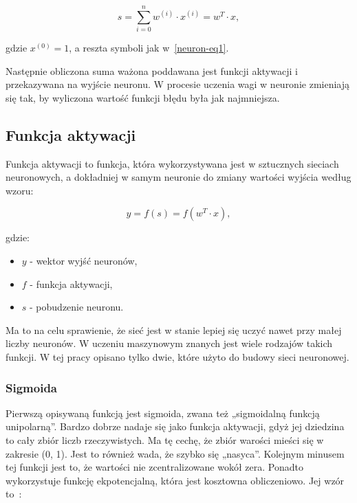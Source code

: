     \begin{equation}
        s = \sum _{i=0}^{n} {w^{(i)} \cdot x^{(i)}} = w^T \cdot x,
        \label{neuron-eq2}
    \end{equation}

    gdzie $x^{(0)} = 1$, a reszta symboli jak w~\ref{neuron-eq1}.

    Następnie obliczona suma ważona poddawana jest funkcji aktywacji i przekazywana na wyjście neuronu.
    W procesie uczenia wagi w neuronie zmieniają się tak, by wyliczona wartość funkcji błędu była jak najmniejsza.

    \subsection{Funkcja aktywacji}\label{subsec:funkcjaAktywacji}

    Funkcja aktywacji to funkcja, która wykorzystywana jest w sztucznych sieciach neuronowych, a dokładniej w samym neuronie do zmiany wartości wyjścia według wzoru:

    \begin{equation}
        y = f(s) = f(w^T \cdot x),
    \end{equation}

    gdzie:
    \begin{itemize}
        \item $y$ - wektor wyjść neuronów,
        \item $f$ - funkcja aktywacji,
        \item $s$ - pobudzenie neuronu.
    \end{itemize}

    Ma to na celu sprawienie, że sieć jest w stanie lepiej się uczyć nawet przy małej liczby neuronów.
    W uczeniu maszynowym znanych jest wiele rodzajów takich funkcji.
    W tej pracy opisano tylko dwie, które użyto do budowy sieci neuronowej.

    \subsubsection{Sigmoida}

    Pierwszą opisywaną funkcją jest sigmoida, zwana też „sigmoidalną funkcją unipolarną”.
    Bardzo dobrze nadaje się jako funkcja aktywacji, gdyż jej dziedzina to cały zbiór liczb rzeczywistych.
    Ma tę cechę, że zbiór warości mieści się w zakresie (0, 1).
    Jest to również wada, że szybko się „nasyca”.
    Kolejnym minusem tej funkcji jest to, że wartości nie zcentralizowane wokół zera.
    Ponadto wykorzystuje funkcję ekpotencjalną, która jest kosztowna obliczeniowo.
    Jej wzór to~\cite{sigmoid}:

